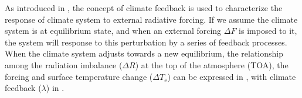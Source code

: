 
As introduced in , the concept of climate feedback is used to characterize the response of climate system to external radiative forcing. If we assume the climate system is at equilibrium state, and when an external forcing $\Delta F$ is imposed to it, the system will response to this perturbation by a series of feedback processes. When the climate system adjusts towards a new equilibrium, the relationship among the radiation imbalance ($\Delta R$) at the top of the atmosphere (TOA), the forcing and surface temperature change  ($\Delta T_s$) can be expressed in , with climate feedback ($\lambda$) in .

